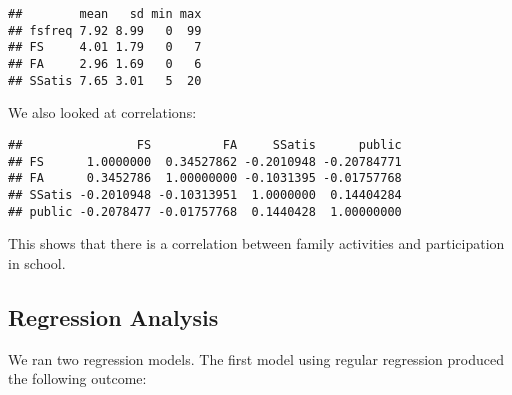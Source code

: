 \documentclass[
  12pt,
]{article}
\newenvironment{Shaded}{\begin{snugshade}}{\end{snugshade}}
\newcommand{\DataTypeTok}[1]{\textcolor[rgb]{0.13,0.29,0.53}{#1}}
\newcommand{\DecValTok}[1]{\textcolor[rgb]{0.00,0.00,0.81}{#1}}
\newcommand{\KeywordTok}[1]{\textcolor[rgb]{0.13,0.29,0.53}{\textbf{#1}}}
\newcommand{\NormalTok}[1]{#1}
\newcommand{\OperatorTok}[1]{\textcolor[rgb]{0.81,0.36,0.00}{\textbf{#1}}}
\newcommand{\OtherTok}[1]{\textcolor[rgb]{0.56,0.35,0.01}{#1}}
\newcommand{\StringTok}[1]{\textcolor[rgb]{0.31,0.60,0.02}{#1}}
\begin{document}
\begin{verbatim}
##        mean   sd min max
## fsfreq 7.92 8.99   0  99
## FS     4.01 1.79   0   7
## FA     2.96 1.69   0   6
## SSatis 7.65 3.01   5  20
\end{verbatim}

We also looked at correlations:

\begin{Shaded}
\end{Shaded}

\begin{verbatim}
##                FS          FA     SSatis      public
## FS      1.0000000  0.34527862 -0.2010948 -0.20784771
## FA      0.3452786  1.00000000 -0.1031395 -0.01757768
## SSatis -0.2010948 -0.10313951  1.0000000  0.14404284
## public -0.2078477 -0.01757768  0.1440428  1.00000000
\end{verbatim}

This shows that there is a correlation between family activities and
participation in school.

\hypertarget{regression-analysis}{%
\subsection{\texorpdfstring{\textbf{Regression
Analysis}}{Regression Analysis}}\label{regression-analysis}}

We ran two regression models. The first model using regular regression
produced the following outcome:
\end{document}
